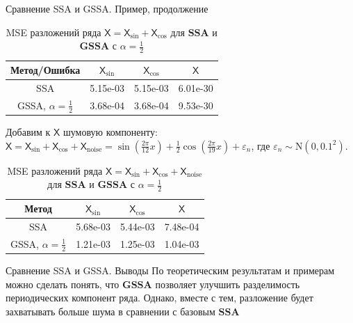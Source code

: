 \documentclass[notheorems, handout]{beamer}
\newcommand{\SSA}{\textbf{SSA}}
\newcommand{\GSSA}{\textbf{GSSA}}
\newcommand{\TS}{\mathsf{X}}
\begin{document}
	
	\begin{frame}{Сравнение SSA и GSSA. Пример, продолжение}
		\begin{table}[H]
			\centering
			\begin{tabular}{c|ccc}
				\hline
				Метод/Ошибка & $\TS_{\sin}$ & $\TS_{\cos}$ & $\TS$ \\ 
				\hline
				SSA   & 5.15e-03 & 5.15e-03 & 6.01e-30\\ 
				GSSA, $\alpha = \frac{1}{2}$  & 3.68e-04 & 3.68e-04 & 9.53e-30 \\ 
				\hline
			\end{tabular}
			\caption{MSE разложений ряда $\TS = \TS_{\sin} + \TS_{\cos}$ для $\SSA$ и $\GSSA$ с $\alpha = \frac{1}{2}$}
			\label{tab:mse_ssa_gssa}
		\end{table}
		Добавим к $\TS$ шумовую компоненту: $\TS = \TS_{\sin} + \TS_{\cos} + \TS_{\mathrm{noise}} =
		\sin\left(\frac{2\pi}{12}x\right) +
		\frac{1}{2}\cos\left(\frac{2\pi}{19}x\right)+
		\varepsilon_n$, 
		где $\varepsilon_n \sim \mathrm N(0, 0.1^2)$.
		\begin{table}[H]
			\centering
			\begin{tabular}{c|ccc}
				\hline
				Метод & $\TS_{\sin}$ & $\TS_{\cos}$ & $\TS$ \\ 
				\hline
				SSA      & 5.68e-03 & 5.44e-03 & 7.48e-04  \\ 
				GSSA, $\alpha = \frac{1}{2}$ & 1.21e-03 & 1.25e-03 & 1.04e-03 \\
				\hline
			\end{tabular}
			\caption{MSE разложений ряда $\TS = \TS_{\sin} + \TS_{\cos} + \TS_{\mathrm{noise}}$ для $\SSA$ и $\GSSA$ с $\alpha = \frac{1}{2}$}
			\label{tab:errs_ssa_gssa}
		\end{table}
	\end{frame}
	
	
	
	\begin{frame}{Сравнение SSA и GSSA. Выводы}
		По теоретическим результатам и примерам можно сделать понять, что $\GSSA$ позволяет улучшить разделимость периодических компонент ряда. Однако, вместе с тем, разложение будет захватывать больше шума в сравнении с базовым $\SSA$
	\end{frame}
	
\end{document}
